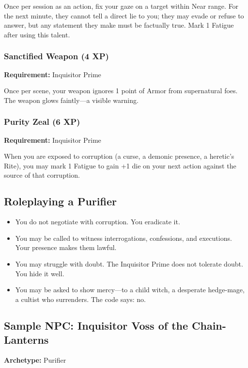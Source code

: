 Once per session as an action, fix your gaze on a target within Near range. For the next minute, they cannot tell a direct lie to you; they may evade or refuse to answer, but any statement they make must be factually true. Mark 1 Fatigue after using this talent.

\subsubsection{Sanctified Weapon (4 XP)}

\textbf{Requirement:} Inquisitor Prime

Once per scene, your weapon ignores 1 point of Armor from supernatural foes. The weapon glows faintly—a visible warning.

\subsubsection{Purity Zeal (6 XP)}

\textbf{Requirement:} Inquisitor Prime

When you are exposed to corruption (a curse, a demonic presence, a heretic's Rite), you may mark 1 Fatigue to gain +1 die on your next action against the source of that corruption.

\subsection{Roleplaying a Purifier}

\begin{itemize}
\item You do not negotiate with corruption. You eradicate it.
\item You may be called to witness interrogations, confessions, and executions. Your presence makes them lawful.
\item You may struggle with doubt. The Inquisitor Prime does not tolerate doubt. You hide it well.
\item You may be asked to show mercy—to a child witch, a desperate hedge-mage, a cultist who surrenders. The code says: no.
\end{itemize}

\subsection{Sample NPC: Inquisitor Voss of the Chain-Lanterns}

\textbf{Archetype:} Purifier

